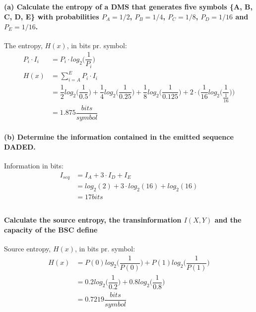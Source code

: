 \documentclass[Main]{subfiles}
\begin{document}
\subsection{}
\paragraph{(a) Calculate the entropy of a DMS that generates five symbols \{A, B, C, D, E\}
with probabilities $P_A = 1/2$, $P_B = 1/4$, $P_C = 1/8$, $P_D = 1/16$ and $P_E = 1/16$.}

The entropy, $H(x)$, in bits pr. symbol:
\begin{align}
P_i \cdot I_i &= P_i \cdot log_2\bigg(\dfrac{1}{P_i}\bigg)\\
H(x) &= \sum_{i=A}^E P_i \cdot I_i\\
	&= \dfrac{1}{2}log_2\bigg(\dfrac{1}{0.5}\bigg) + \dfrac{1}{4} log_2\bigg( \dfrac{1}{0.25} \bigg) + \dfrac{1}{8} log_2 \bigg( \dfrac{1}{0.125} \bigg) + 2\cdot \Bigg( \dfrac{1}{16} log_2 \bigg( \dfrac{1}{\frac{1}{16}} \bigg) \Bigg)\\
	&= 1.875 \dfrac{bits}{symbol}
\end{align}



\paragraph{(b) Determine the information contained in the emitted sequence DADED.}
Information in bits:
\begin{align}
I_{seq} &= I_A + 3\cdot I_D + I_E\\
	&= log_2(2) + 3\cdot log_2(16) + log_2(16)\\
	&= 17 bits
\end{align}

\subsection{}
\paragraph{Calculate the source entropy, the transinformation $I(X, Y)$ and the capacity of
the BSC define}

Source entropy, $H(x)$, in bits pr. symbol:
\begin{align}
H(x) &= P(0) log_2\bigg(\dfrac{1}{P(0)}\bigg) + P(1) log_2\bigg(\dfrac{1}{P(1)}\bigg)\\
	&= 0.2 log_2\bigg(\dfrac{1}{0.2}\bigg) + 0.8 log_2\bigg(\dfrac{1}{0.8}\bigg)\\
	&= 0.7219 \dfrac{bits}{symbol}
\end{align}
\end{document}
